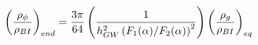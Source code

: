 \begin{equation}
{\left(\rho_{\phi} \over \rho_{BI}\right)_{end}}=
{3 \pi \over  64 }\left({1 \over {h_{GW}^2\left(F_1(\alpha)/F_2(\alpha)\right)^2}}\right)\left({\rho_g \over \rho_{BI}} \right)_{eq}
\label{endratio}
\end{equation}

